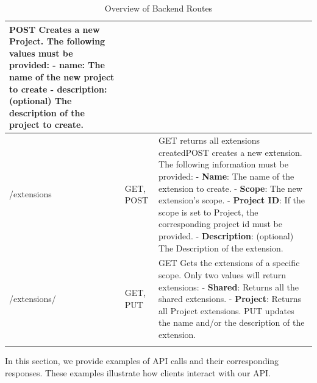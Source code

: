 \begin{longtable}{|l|p{3cm}|>{\raggedright\arraybackslash}p{7cm}|}
    \newline\newline POST Creates a new Project. The following values must be provided:
    \newline\newline - \textbf{name}: The name of the new project to create
    \newline\newline - \textbf{description}: (optional) The description of the project to create.\\
    \hline
    /extensions & GET, POST & GET returns all extensions created\newline\newline POST creates a new extension. The following information must be provided:
    \newline\newline - \textbf{Name}: The name of the extension to create.
    \newline\newline - \textbf{Scope}: The new extension's scope.
    \newline\newline - \textbf{Project ID}: If the scope is set to Project, the corresponding project id must be provided.
    \newline\newline - \textbf{Description}: (optional) The Description of the extension.\\
    \hline
    /extensions/ & GET, PUT & GET Gets the extensions of a specific scope.
    Only two values will return extensions:
    \newline\newline - \textbf{Shared}: Returns all the shared extensions.
    \newline\newline - \textbf{Project}: Returns all Project extensions.
    \newline\newline PUT updates the name and/or the description of the extension.\\
    \hline
    \caption{Overview of Backend Routes}
    \label{tab:table_routes}
\end{longtable}

\label{subsubsec:api-examples}

In this section, we provide examples of API calls and their corresponding responses.
These examples illustrate how clients interact with our API.


